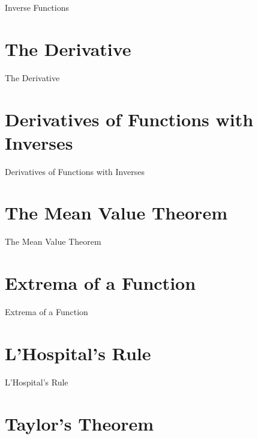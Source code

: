 Inverse Functions

\section{The Derivative}
\label{sec:the-derivative}

The Derivative

\section{Derivatives of Functions with Inverses}
\label{sec:derivatives-of-functions-with-inverses}

Derivatives of Functions with Inverses

\section{The Mean Value Theorem}
\label{sec:the-mean-value-theorem}

The Mean Value Theorem

\section{Extrema of a Function}
\label{sec:extrema-of-a-function}

Extrema of a Function

\section{L'Hospital's Rule}
\label{sec:l-hospital-s-rule}

L'Hospital's Rule

\section{Taylor's Theorem}
\label{sec:taylor-s-theorem}


